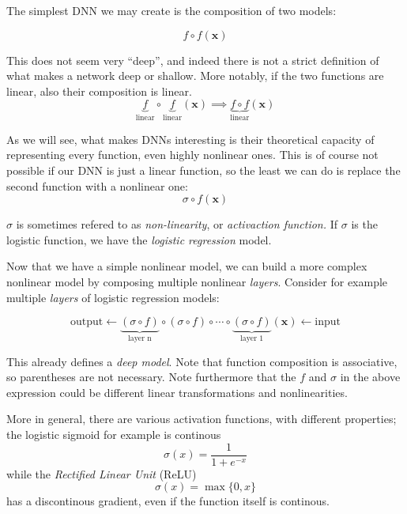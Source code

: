 
The simplest DNN we may create is the composition of two models:

\begin{equation}
    f \circ  f(\mathbf{x})
\end{equation}

This does not seem very ``deep'', and indeed there is not a strict definition of what makes a network deep or shallow. More notably, if the two functions are linear, also their composition is linear.
\begin{equation}
    \underbrace{f}_{\textrm{linear}} \circ  \underbrace{f}_{\textrm{linear}}(\mathbf{x}) \implies \underbrace{f \circ  f}_{\textrm{linear}}(\mathbf{x})
\end{equation}

As we will see, what makes DNNs interesting is their theoretical capacity of representing every function, even highly nonlinear ones. This is of course not possible if our DNN is just a linear function, so the least we can do is replace the second function with a nonlinear one:
\begin{equation}
    \sigma \circ  f(\mathbf{x})
\end{equation} 

$\sigma$ is sometimes refered to as \emph{non-linearity}, or \emph{activaction function.} If $\sigma$ is the logistic function, we have the \emph{logistic regression} model. 

Now that we have a simple nonlinear model, we can build a more complex nonlinear model by composing multiple nonlinear \emph{layers}.
Consider for example multiple \emph{layers} of logistic regression models:

\begin{equation}
	\textrm{output} \leftarrow 
	\underbrace{(\sigma \circ f)}_{\textrm{layer n}}
	\circ (\sigma \circ f) 
	\circ \cdots \circ 
	\underbrace{(\sigma \circ  f)}_{\textrm{layer 1}}(\mathbf{x})
	\leftarrow {\textrm{input}} 
\end{equation}

This already defines a \emph{deep model}. Note that function composition is associative, so parentheses are not necessary. Note furthermore that the $f$ and $\sigma$ in the above expression could be different linear transformations and nonlinearities.

More in general, there are various activation functions, with different properties; the logistic sigmoid for example is continous
\begin{equation}
    \sigma(x) = \frac{1}{1+e^{-x}} 
\end{equation} 
while the \emph{Rectified Linear Unit} (ReLU)
\begin{equation}
	\sigma(x) = \max\{0, x\}
\end{equation}
has a discontinous gradient, even if the function itself is continous.